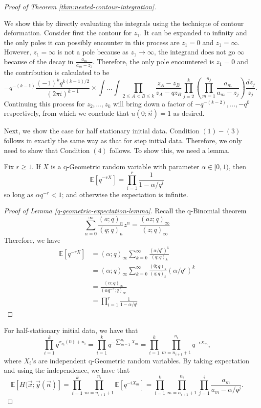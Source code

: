 \begin{proof}[Proof of Theorem \ref{thm:nested-contour-integration}]
\begin{enumerate}
We show this by directly evaluating the integrals using the technique of contour deformation. Consider first the contour for $z_1$. It can be expanded to infinity and the only poles it can possibly encounter in this process are $z_1 = 0$ and $z_1 = \infty$. However, $z_1 = \infty$ is not a pole because as $z_1 \rightarrow \infty$, the integrand does not go $\infty$ because of the decay in $\frac{a_m}{a_m - z_1}$. Therefore, the only pole encountered is $z_1 = 0$ and the contribution is calculated to be $$-q^{-(k-1)} \frac{(-1)^k q^{k(k-1)/2}}{(2 \pi i)^{k-1}} \times \int \dots \int \prod_{2 \le A < B \le k} \frac{z_A - z_B}{z_A - qz_B} \prod_{j=2}^k \left( \prod_{m=1}^{n_j} \frac{a_m}{a_m - z_j}\right) \frac{dz_j}{z_j}.$$ Continuing this process for $z_2, \dots, z_{k}$ will bring down a factor of $-q^{-(k-2)}, \dots, -q^{0}$ respectively, from which we conclude that $u(0;\vec{n}) = 1$ as desired.
\end{enumerate}

Next, we show the case for half stationary initial data. Condition $(1) - (3)$ follows in exactly the same way as that for step initial data. Therefore, we only need to show that Condition $(4)$ follows. To show this, we need a lemma. 

\begin{lemma}
\label{q-geometric-expectation-lemma}
Fix $r \ge 1$. If $X$ is a q-Geometric random variable with parameter $\alpha \in [0,1)$, then $$\mathbb{E}\left[ q^{-rX} \right] = \prod_{i=1}^{r} \frac{1}{1- \alpha / q^i}$$ so long as $\alpha q^{-r} < 1$; and otherwise the expectation is infinite.
\end{lemma}

\begin{proof}[Proof of Lemma \ref{q-geometric-expectation-lemma}]
Recall the q-Binomial theorem $$\sum_{n=0}^{\infty} \frac{(a;q)_n}{(q;q)_n} z^n = \frac{(az;q)_{\infty}}{(z;q)_{\infty}}$$
Therefore, we have 
\begin{align*}
\mathbb{E} \left[ q^{-rX} \right] &= (\alpha; q)_{\infty} \sum_{k=0}^{\infty} \frac{(\alpha / q^r)^k}{(q;q)_k}\\
																	&= (\alpha; q)_{\infty} \sum_{k=0}^{\infty} \frac{(0;q)_k}{(q;q)_k} (\alpha / q^r)^k\\
																	&= \frac{(\alpha; q)_{\infty} }{(\alpha q^{-r}; q)_{\infty}}\\
																	&= \prod_{i=1}^{r} \frac{1}{1- \alpha / q^i}
\end{align*}
\end{proof}
For half-stationary initial data, we have that $$\prod_{i=1}^{k} q^{x_{n_i}(0) + n_i} = \prod_{i=1}^{k} q^{-\sum_{m=1}^{n_i} X_m} = \prod_{i=1}^{k} \prod_{m=n_{i+1} +1}^{n_i} q^{-iX_m},$$ where $X_i$'s are independent q-Geometric random variables. By taking expectation and using the independence, we have that $$\mathbb{E} [H(\vec{x}; \vec{y}(\vec{n})] =  \prod_{i=1}^{k} \prod_{m=n_{i+1} +1}^{n_i} \mathbb{E}\left[ q^{-iX_m} \right] = \prod_{i=1}^{k} \prod_{m=n_{i+1} +1}^{n_i} \prod_{j=1}^{i} \frac{a_m}{a_m - \alpha / q^j}.$$


\end{proof}
